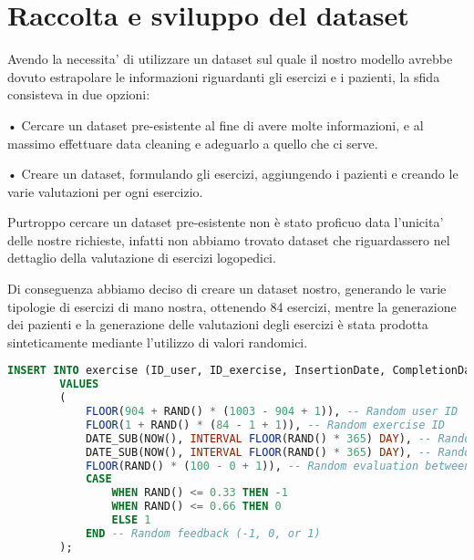 \documentclass{article}
\begin{document}
    \section{Raccolta e sviluppo del dataset}

    Avendo la necessita' di utilizzare un dataset sul quale il nostro modello avrebbe dovuto estrapolare le informazioni riguardanti gli esercizi e i pazienti, la sfida
    consisteva in due opzioni:

    • Cercare un dataset pre-esistente al fine di avere molte informazioni, e al massimo effettuare data cleaning e adeguarlo a quello che ci serve.

    • Creare un dataset, formulando gli esercizi, aggiungendo i pazienti e creando le varie valutazioni per ogni esercizio.

    Purtroppo cercare un dataset pre-esistente non è stato proficuo data l'unicita' delle nostre richieste, infatti non abbiamo trovato dataset che
    riguardassero nel dettaglio della valutazione di esercizi logopedici.

    Di conseguenza abbiamo deciso di creare un dataset nostro, generando le varie tipologie di esercizi di mano nostra, ottenendo 84 esercizi, mentre la generazione
    dei pazienti e la generazione delle valutazioni degli esercizi è stata prodotta sinteticamente mediante l'utilizzo di valori randomici.

    \pagebreak
    \begin{lstlisting}[language=SQL, breaklines, caption=Generazione Casuale esecuzione esercizio]
        INSERT INTO exercise (ID_user, ID_exercise, InsertionDate, CompletionDate, Evaluation, Feedback)
        VALUES
        (
            FLOOR(904 + RAND() * (1003 - 904 + 1)), -- Random user ID
            FLOOR(1 + RAND() * (84 - 1 + 1)), -- Random exercise ID
            DATE_SUB(NOW(), INTERVAL FLOOR(RAND() * 365) DAY), -- Random date within the past year
            DATE_SUB(NOW(), INTERVAL FLOOR(RAND() * 365) DAY), -- Random completion date within the past year
            FLOOR(RAND() * (100 - 0 + 1)), -- Random evaluation between 0 and 100
            CASE
                WHEN RAND() <= 0.33 THEN -1
                WHEN RAND() <= 0.66 THEN 0
                ELSE 1
            END -- Random feedback (-1, 0, or 1)
        );
    \end{lstlisting}
\end{document}
